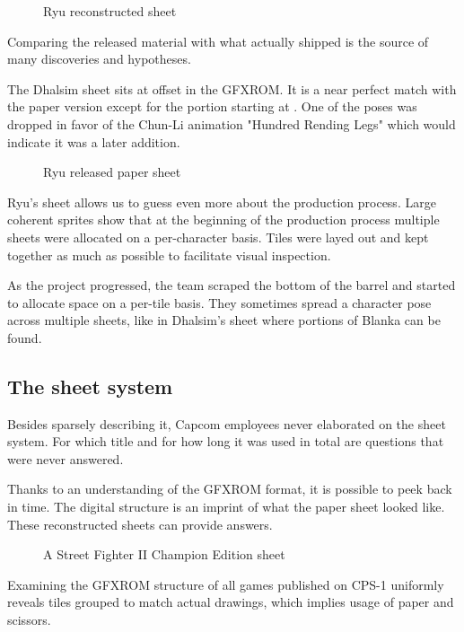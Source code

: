  \begin{figure}[H]
\caption*{Ryu reconstructed sheet}
\end{figure}


Comparing the released material with what actually shipped is the source of many discoveries and hypotheses. 

The Dhalsim sheet sits at offset  in the GFXROM. It is a near perfect match with the paper version except for the portion starting at . One of the poses was dropped in favor of the Chun-Li animation "Hundred Rending Legs" which would indicate it was a later addition. 

 \begin{figure}[H]
\caption*{Ryu released paper sheet}
\end{figure}

Ryu's sheet  allows us to guess even more about the production process. Large coherent sprites show that at the beginning of the production process multiple sheets were allocated on a per-character basis. Tiles were layed out and kept together as much as possible to facilitate visual inspection.

As the project progressed, the team scraped the bottom of the barrel and started to allocate space on a per-tile basis. They sometimes spread a character pose across multiple sheets, like in Dhalsim's sheet where portions of Blanka can be found.

\subsection{The sheet system}
Besides sparsely describing it, Capcom employees never elaborated on the sheet system. For which title and for how long it was used in total are questions that were never answered.

Thanks to an understanding of the GFXROM format, it is possible to peek back in time. The digital structure is an imprint of what the paper sheet looked like. These reconstructed sheets can provide answers.

 \begin{figure}[H]
\caption*{A Street Fighter II Champion Edition sheet}
\end{figure}

Examining the GFXROM structure of all games published on CPS-1 uniformly reveals tiles grouped to match actual drawings, which implies usage of paper and scissors.

